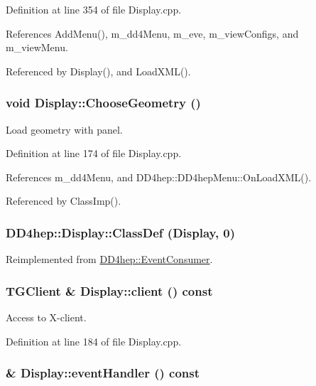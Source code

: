 Definition at line 354 of file Display.cpp.

References AddMenu(), m\_\-dd4Menu, m\_\-eve, m\_\-viewConfigs, and m\_\-viewMenu.

Referenced by Display(), and LoadXML().\hypertarget{class_d_d4hep_1_1_display_aa6b61d0d86f9307e516996d71b38abfa}{
\subsubsection[{ChooseGeometry}]{\setlength{\rightskip}{0pt plus 5cm}void Display::ChooseGeometry ()}}
\label{class_d_d4hep_1_1_display_aa6b61d0d86f9307e516996d71b38abfa}


Load geometry with panel. 

Definition at line 174 of file Display.cpp.

References m\_\-dd4Menu, and DD4hep::DD4hepMenu::OnLoadXML().

Referenced by ClassImp().\hypertarget{class_d_d4hep_1_1_display_a400873f854d08d19a22939eab0bc5b5a}{
\subsubsection[{ClassDef}]{\setlength{\rightskip}{0pt plus 5cm}DD4hep::Display::ClassDef ({\bf Display}, \/  0)}}
\label{class_d_d4hep_1_1_display_a400873f854d08d19a22939eab0bc5b5a}


Reimplemented from \hyperlink{class_d_d4hep_1_1_event_consumer_a659e7fffc8eb8674af560b124f2a648d}{DD4hep::EventConsumer}.\hypertarget{class_d_d4hep_1_1_display_af288800c5dd6b506fa44db0b214fe0ea}{
\subsubsection[{client}]{\setlength{\rightskip}{0pt plus 5cm}TGClient \& Display::client () const}}
\label{class_d_d4hep_1_1_display_af288800c5dd6b506fa44db0b214fe0ea}


Access to X-\/client. 

Definition at line 184 of file Display.cpp.\hypertarget{class_d_d4hep_1_1_display_ae34aaf5ab6c230281e4804632cb9eb7e}{
\subsubsection[{eventHandler}]{ \& Display::eventHandler () const}}
\label{class_d_d4hep_1_1_display_ae34aaf5ab6c230281e4804632cb9eb7e}


